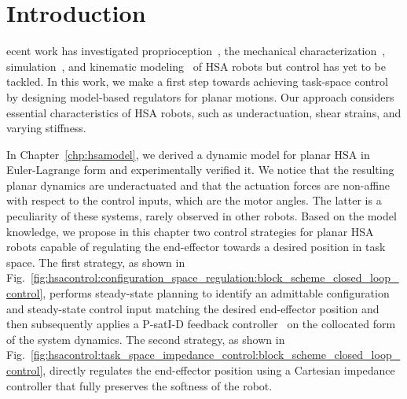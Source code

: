 \section{Introduction}
ecent work has investigated proprioception~\citep{zhang2022vision}, the mechanical characterization~\citep{good2022expanding}, simulation~\citep{stolzle2023modelling}, and kinematic modeling~\citep{garg2022kinematic, stolzle2023modelling} of \gls{HSA} robots but control has yet to be tackled.
In this work, we make a first step towards achieving task-space control by designing model-based regulators for planar motions. Our approach considers essential characteristics of \gls{HSA} robots, such as underactuation, shear strains, and varying stiffness. %

In Chapter~\ref{chp:hsamodel}, we derived a dynamic model for planar \gls{HSA} in Euler-Lagrange form and experimentally verified it.
We notice that the resulting planar dynamics are underactuated and that the actuation forces are non-affine with respect to the control inputs, which are the motor angles. The latter is a peculiarity of these systems, rarely observed in other robots.
Based on the model knowledge, we propose in this chapter two control strategies for planar \gls{HSA} robots capable of regulating the end-effector towards a desired position in task space.
The first strategy, as shown in Fig.~\ref{fig:hsacontrol:configuration_space_regulation:block_scheme_closed_loop_control}, performs steady-state planning to identify an admittable configuration and steady-state control input matching the desired end-effector position and then subsequently applies a P-satI-D feedback controller~\citep{pustina2022p} on the collocated form~\citep{pustina2024input} of the system dynamics.
The second strategy, as shown in Fig.~\ref{fig:hsacontrol:task_space_impedance_control:block_scheme_closed_loop_control}, directly regulates the end-effector position using a Cartesian impedance controller that fully preserves the softness of the robot.

